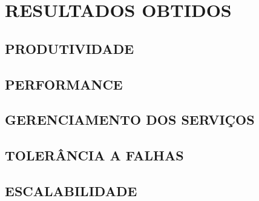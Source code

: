 \chapter{RESULTADOS OBTIDOS}
\label{chp:resultados}

\section{PRODUTIVIDADE}

\section{PERFORMANCE}

\section{GERENCIAMENTO DOS SERVIÇOS}

\section{TOLERÂNCIA A FALHAS}

\section{ESCALABILIDADE}
